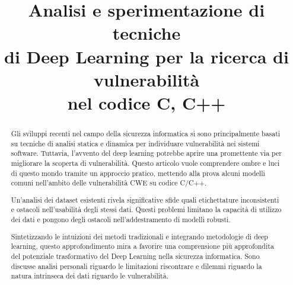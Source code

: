 \documentclass[conference]{IEEEtran}
\begin{document}
\title{Analisi e sperimentazione di tecniche \\ di Deep Learning per la ricerca di vulnerabilità \\ nel codice C, C++}

\author{
}

\maketitle

\begin{abstract}
Gli sviluppi recenti nel campo della sicurezza informatica si sono principalmente basati su tecniche di analisi statica e dinamica per individuare vulnerabilità nei sistemi software. Tuttavia, l'avvento del deep learning potrebbe aprire una promettente via per migliorare la scoperta di vulnerabilità. Questo articolo vuole comprendere ombre e luci di questo mondo tramite un approccio pratico, mettendo alla prova alcuni modelli comuni nell'ambito delle vulnerabilità CWE su codice C/C++.

Un'analisi dei dataset esistenti rivela significative sfide quali etichettature inconsistenti e ostacoli nell'usabilità degli stessi dati. Questi problemi limitano la capacità di utilizzo dei dati e pongono degli ostacoli nell'addestramento di modelli robusti.

Sintetizzando le intuizioni dei metodi tradizionali e integrando metodologie di deep learning, questo approfondimento mira a favorire una comprensione più approfondita del potenziale trasformativo del Deep Learning nella sicurezza informatica. Sono discusse analisi personali riguardo le limitazioni riscontrare e dilemmi riguardo la natura intrinseca dei dati riguardo le vulnerabilità.
\end{abstract}
\end{document}
